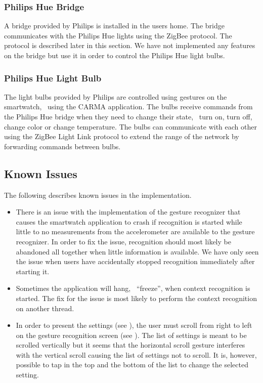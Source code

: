 \subsubsection{Philips Hue Bridge}

A bridge provided by Philips is installed in the users home. The bridge communicates with the Philips Hue lights using the ZigBee protocol. The protocol is described later in this section. We have not implemented any features on the bridge but use it in order to control the Philips Hue light bulbs.

\subsubsection{Philips Hue Light Bulb}

The light bulbs provided by Philips are controlled using gestures on the smartwatch, \ie~using the CARMA application. The bulbs receive commands from the Philips Hue bridge when they need to change their state, \eg~turn on, turn off, change color or change temperature. The bulbs can communicate with each other using the ZigBee Light Link protocol to extend the range of the network by forwarding commands between bulbs.

\subsection{Known Issues}

The following describes known issues in the implementation.

\begin{itemize}
\item There is an issue with the implementation of the gesture recognizer that causes the smartwatch application to crash if recognition is started while little to no measurements from the accelerometer are available to the gesture recognizer. In order to fix the issue, recognition should most likely be abandoned all together when little information is available. We have only seen the issue when users have accidentally stopped recognition immediately after starting it.
\item Sometimes the application will hang, \ie~``freeze'', when context recognition is started. The fix for the issue is most likely to perform the context recognition on another thread.
\item In order to present the settings (see ), the user must scroll from right to left on the gesture recognition screen (see ). The list of settings is meant to be scrolled vertically but it seems that the horizontal scroll gesture interferes with the vertical scroll causing the list of settings not to scroll. It is, however, possible to tap in the top and the bottom of the list to change the selected setting.
\end{itemize}

